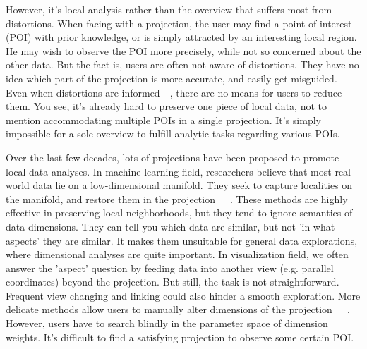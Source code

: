 However, it's local analysis rather than the overview that suffers most from distortions. When facing with a projection, the user may find a point of interest (POI) with prior knowledge, or is simply attracted by an interesting local region. He may wish to observe the POI more precisely, while not so concerned about the other data. But the fact is, users are often not aware of distortions. They have no idea which part of the projection is more accurate, and easily get misguided. Even when distortions are informed~\cite{DBLP:journals/ijon/Aupetit07}~\cite{DBLP:journals/cgf/LiuWBP14}, there are no means for users to reduce them. You see, it's already hard to preserve one piece of local data, not to mention accommodating multiple POIs in a single projection. It's simply impossible for a sole overview to fulfill analytic tasks regarding various POIs.

Over the last few decades, lots of projections have been proposed to promote local data analyses. In machine learning field, researchers believe that most real-world data lie on a low-dimensional manifold. They seek to capture localities on the manifold, and restore them in the projection~\cite{DBLP:journals/neco/BelkinN03}~\cite{roweis2000nonlinear}~\cite{DBLP:journals/corr/cs-LG-0212008}. These methods are highly effective in preserving local neighborhoods, but they tend to ignore semantics of data dimensions. They can tell you which data are similar, but not 'in what aspects' they are similar. It makes them unsuitable for general data explorations, where dimensional analyses are quite important. In visualization field, we often answer the 'aspect' question by feeding data into another view (e.g. parallel coordinates) beyond the projection. But still, the task is not straightforward. Frequent view changing and linking could also hinder a smooth exploration. More delicate methods allow users to manually alter dimensions of the projection~\cite{DBLP:journals/cgf/JeongZFRC09}~\cite{DBLP:journals/tvcg/NamM13}~\cite{DBLP:journals/tvcg/LehmannT13}. However, users have to search blindly in the parameter space of dimension weights. It's difficult to find a satisfying projection to observe some certain POI.

